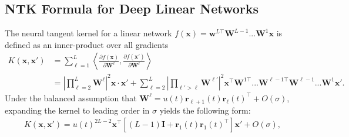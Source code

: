 \documentclass{article} %
\def\x{\bm x}
\begin{document}
\begin{appendix}
\section{NTK Formula for Deep Linear Networks}\label{app:ntk_formula_deep_linear}

The neural tangent kernel for a linear network $f(\x) = \bm w^{L \top} \bm W^{L-1} ... \bm W^1 \x$ is defined as an inner-product over all gradients
\begin{equation}
    \begin{aligned}
    K(\x,\x') &= \sum_{\ell=1}^L \left< \frac{\partial f(\x)}{\partial \bm W^{\ell }} , \frac{\partial f(\x')}{\partial \bm W^{\ell }} \right>
    \\
    &= \left| \prod_{\ell=2}^L \bm W^{\ell} \right|^2 \x \cdot \x' + \sum_{\ell=2}^L \left|\prod_{\ell' > \ell} \bm W^{\ell'} \right|^2  \x^\top \bm W^{1\top} ... \bm W^{\ell-1 \top} \bm W^{\ell-1} ... \bm W^{1} \x' .
\end{aligned}
\end{equation}
Under the balanced assumption that $\bm W^{\ell} = u(t) \bm r_{\ell+1}(t) \bm r_{\ell}(t)^\top + O(\sigma)$, expanding the kernel to leading order in $\sigma$ yields the following form:
\begin{align}
    K(\x,\x') = u(t)^{2L-2} \x^\top \left[ (L-1) \bm I + \bm r_1(t) \bm r_1(t)^\top \right] \bm x' + O(\sigma),
\end{align}


\end{appendix}
\end{document}
